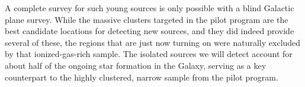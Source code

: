 \documentclass[11pt,preprint]{aastex_nofoot}
\begin{document}
A complete survey for such young sources is only possible with a blind
Galactic plane survey.  While the massive clusters targeted in the pilot
program are the best candidate locations for detecting new sources, and
they did indeed provide several of these, the regions that are just now
turning on were naturally excluded by that ionized-gas-rich sample.
The isolated sources we will detect account for about half of the ongoing
star formation in the Galaxy, serving as a key counterpart to the 
highly clustered, narrow sample from the pilot program.






\end{document}
